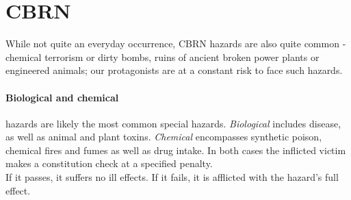 \documentclass[12pt,a4paper,openany,usenames,dvipsnames]{book}
\begin{document}
	\section{CBRN}
	\label{hazards:cbrn}
	While not quite an everyday occurrence, CBRN hazards are also quite common - chemical terrorism or dirty bombs, ruins of ancient broken power plants or engineered animals; our protagonists are at a constant risk to face such hazards.
	\paragraph{Biological and chemical} hazards are likely the most common special hazards. \emph{Biological} includes disease, as well as animal and plant toxins. \emph{Chemical} encompasses synthetic poison, chemical fires and fumes as well as drug intake. In both cases the inflicted victim makes a constitution check at a specified penalty.\\
	If it passes, it suffers no ill effects. If it fails, it is afflicted with the hazard’s full effect.
\end{document}

